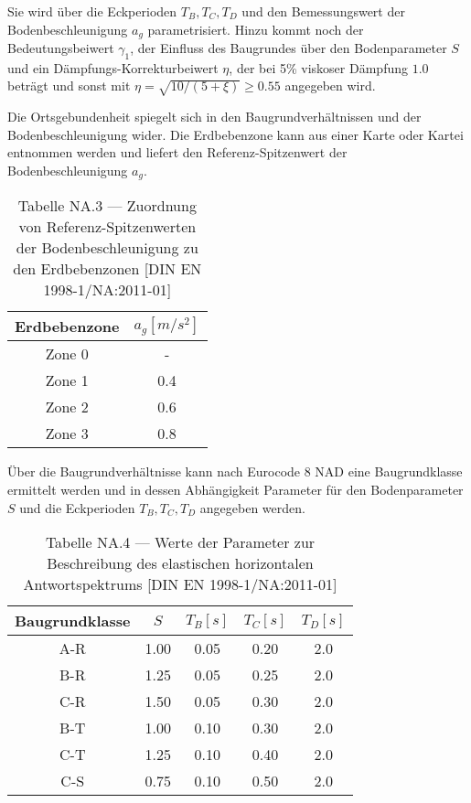 Sie wird über die Eckperioden $T_B, T_C, T_D$ und den Bemessungswert der Bodenbeschleunigung $a_g$ parametrisiert. Hinzu kommt noch der Bedeutungsbeiwert $\gamma_1$, der Einfluss des Baugrundes über den Bodenparameter $S$ und ein Dämpfungs-Korrekturbeiwert $\eta$, der bei 5\% viskoser Dämpfung $1.0$ beträgt und sonst mit $\eta=\sqrt{10/(5+\xi)}\geq 0.55$ angegeben wird.

Die Ortsgebundenheit spiegelt sich in den Baugrundverhältnissen und der Bodenbeschleunigung wider. Die Erdbebenzone kann aus einer Karte oder Kartei entnommen werden und liefert den Referenz-Spitzenwert der Bodenbeschleunigung $a_g$.

\begin{table}[H]
\centering
\begin{tabular}{ |c|c| } 
 \hline
 Erdbebenzone & $a_g [m/s^2]$ \\
 \hline\hline
 Zone 0 & - \\ 
 Zone 1 & 0.4 \\ 
 Zone 2 & 0.6 \\ 
 Zone 3 & 0.8 \\ 
 \hline
\end{tabular}
\caption{Tabelle NA.3 — Zuordnung von Referenz-Spitzenwerten der Bodenbeschleunigung zu den Erdbebenzonen [DIN EN 1998-1/NA:2011-01]}
\end{table}

Über die Baugrundverhältnisse kann nach Eurocode 8 NAD eine Baugrundklasse ermittelt werden und in dessen Abhängigkeit Parameter für den Bodenparameter $S$ und die Eckperioden $T_B, T_C, T_D$ angegeben werden.

\begin{table}[H]
\centering
\begin{tabular}{ |c|c|c|c|c| } 
 \hline
 Baugrundklasse & $S$ & $T_B [s]$ & $T_C [s]$ & $T_D [s]$\\
 \hline\hline
 A-R  & 1.00 & 0.05 & 0.20 & 2.0\\ 
 B-R  & 1.25 & 0.05 & 0.25 & 2.0\\ 
 C-R  & 1.50 & 0.05 & 0.30 & 2.0\\ 
 \hline
 B-T  & 1.00 & 0.10 & 0.30 & 2.0\\
 C-T  & 1.25 & 0.10 & 0.40 & 2.0\\
 \hline
 C-S  & 0.75 & 0.10 & 0.50 & 2.0\\
 \hline
\end{tabular}
\caption{Tabelle NA.4 — Werte der Parameter zur Beschreibung des elastischen horizontalen Antwortspektrums [DIN EN 1998-1/NA:2011-01]}
\end{table}

